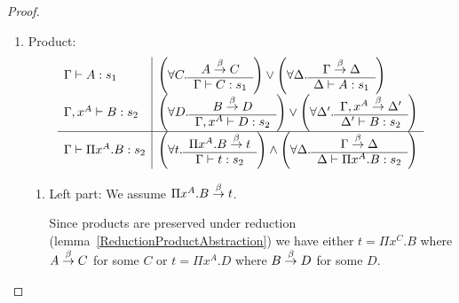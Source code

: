 \begin{theorem}
{\begin{proof}
\begin{enumerate}
\begin{enumerate}
                    For the right part we assume $\Gamma,x^A \reduce \Delta$.
                    There are two possibilities:
                    \begin{enumerate}
                        \item $\Delta = \Delta_0,x^A$ where $\Gamma \reduce
                            \Delta_0$ for some $\Delta_0$:

                        In that case we get $\Delta_0 \vdash A: s$ from the
                            induction hypothesis which implies the goal
                            $\Delta_0,x^A \vdash x: A$.

                        \item $\Delta = \Gamma,x^B$ where $A \reduce B$:

                        In that case we get $\Gamma \vdash B : s$ from the
                            induction hypothesis which implies the goal
                            $\Gamma,x^B: x \vdash B$.
                    \end{enumerate}

                \item Product:
                $$
                \begin{array}{l|l}
                    \Gamma \vdash A: s_1
                    &
                    \left( \forall C. \begin{array}{c} A \stackrel{\beta}{\to} C \\ \hline \Gamma \vdash C: s_1\end{array} \right)
                    \lor
                    \left( \forall \Delta. \begin{array}{c} \Gamma \stackrel{\beta}{\to} \Delta \\ \hline \Delta \vdash A: s_1\end{array} \right)
                    \\
                    \Gamma,x^A \vdash B: s_2
                    &
                    \left( \forall D. \begin{array}{c} B \stackrel{\beta}{\to} D \\ \hline \Gamma,x^A \vdash D: s_2\end{array} \right)
                    \lor
                    \left( \forall \Delta'. \begin{array}{c} \Gamma,x^A \stackrel{\beta}{\to} \Delta' \\ \hline \Delta' \vdash B: s_2\end{array} \right)
                    \\
                    \hline
                    \Gamma \vdash \Pi x^A. B : s_2
                    &
                    \left( \forall t. \begin{array}{c} \Pi x^A.B \stackrel{\beta}{\to} t \\ \hline \Gamma \vdash t: s_2\end{array} \right)
                    \land
                    \left( \forall \Delta. \begin{array}{c} \Gamma \stackrel{\beta}{\to} \Delta \\ \hline \Delta \vdash \Pi x^A. B: s_2\end{array} \right)
                \end{array}
                $$
                \begin{enumerate}
                    \item Left part: We assume $\Pi x^A. B \stackrel{\beta}{\to} t$.

                    Since products are preserved under reduction
                        (lemma~\ref{ReductionProductAbstraction}) we have either
                        $t = \Pi x^C. B$ where $A \stackrel{\beta}{\to} C$ for some $C$ or $t
                        = \Pi x^A.D$ where $B \stackrel{\beta}{\to} D$ for some $D$.


\end{enumerate}
\end{enumerate}
\end{enumerate}
\end{proof}}
\end{theorem}
